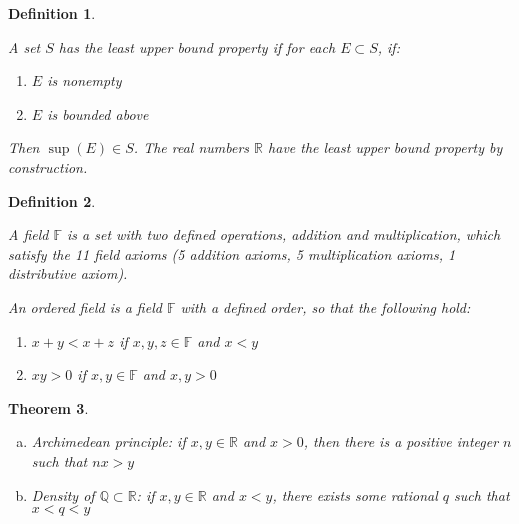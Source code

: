 \documentclass[12pt]{article}
\newtheorem{theorem}{Theorem}[section]
\newtheorem{definition}[theorem]{Definition}
\newcommand{\R}{\mathbb{R}}
\newcommand{\Q}{\mathbb{Q}}
\newcommand{\F}{\mathbb{F}}
\begin{document}
\begin{definition}

    \label{lubness}

    A set $S$ has the least upper bound property if for each $E \subset S$, if:
    
    \begin{enumerate}
        \item $E$ is nonempty
        \item $E$ is bounded above
    \end{enumerate}
    
    Then $\sup(E) \in S$. The real numbers $\R$ have the least upper bound property by construction.
    
\end{definition}

\begin{definition}
    
    \label{ordered}
    
    A field $\F$ is a set with two defined operations, addition and multiplication, which satisfy the 11 field axioms (5 addition axioms, 5 multiplication axioms, 1 distributive axiom).
    
    An ordered field is a field $\F$ with a defined order, so that the following hold:
    
    \begin{enumerate}
        \item $x + y < x + z$ if $x, y, z \in \F$ and $x < y$
        \item $xy > 0$ if $x, y \in \F$ and $x, y > 0$
    \end{enumerate}
    
\end{definition}

\begin{theorem}
    
    \begin{enumerate}[(a)]
        \item Archimedean principle: if $x, y \in \R$ and $x>0$, then there is a positive integer $n$ such that $nx > y$
        \item Density of $\Q \subset \R$: if $x, y \in \R$ and $x < y$, there exists some rational $q$ such that $x < q < y$ 
    \end{enumerate}
    
\end{theorem}
\end{document}
